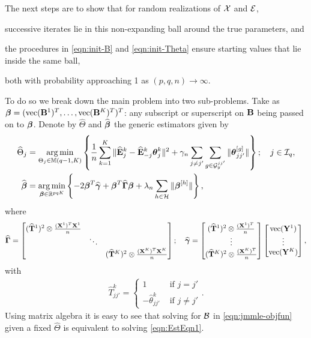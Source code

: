 The next steps are to show that for random realizations of ${\cal{X}}$ and ${\cal{E}}$,
%

\vspace{1em}
 successive iterates lie in this non-expanding ball around the true parameters, and

 the procedures in \eqref{eqn:init-B} and \eqref{eqn:init-Theta} ensure starting values that lie inside the same ball,
%

\vspace{1em}
\noindent both with probability approaching 1 as $(p,q,n) \rightarrow \infty$.

To do so we break down the main problem into two sub-problems. Take as ${\boldsymbol{\beta}} = (\operatorname*{vec} ({\mathbf{B}}^1)^T, \ldots, \operatorname*{vec}({\mathbf{B}}^K)^T)^T$: any subscript or superscript on ${\mathbf{B}}$ being passed on to ${\boldsymbol{\beta}}$. Denote by $\widehat \Theta$ and $\widehat {{\boldsymbol{\beta}}}$ the generic estimators given by
%
\begin{align}
\widehat \Theta_j &= \operatorname*{arg\,min}_{\Theta_j \in {\mathbb{M}}(q-1, K)} \left\{ \frac{1}{n} \sum_{k=1}^K \| \widehat {{\mathbf{E}}}^k_j - \widehat {{\mathbf{E}}}^k_{-j} {\boldsymbol{\theta}}_j^k \|^2 + \gamma_n \sum_{j \neq j'} \sum_{g \in {\cal{G}}_y^{jj'}} \| {\boldsymbol{\theta}}_{jj'}^{[g]} \| \right\};
\quad j \in {\cal{I}}_q, \label{eqn:EstEqn2}\\
\widehat {{\boldsymbol{\beta}}} &= \operatorname*{arg\,min}_{{\boldsymbol{\beta}} \in {\mathbb{R}}^{pqK}} \left\{-2 {\boldsymbol{\beta}}^T \widehat {{\boldsymbol{\gamma}}} + {\boldsymbol{\beta}}^T \widehat {{\boldsymbol{\Gamma}}} {\boldsymbol{\beta}} + \lambda_n \sum_{h \in {\cal{H}}} \| {\boldsymbol{\beta}}^{[h]}  \| \right\}, \label{eqn:EstEqn1}
\end{align}
%
where
%
$$
\widehat {{\boldsymbol{\Gamma}}} = \begin{bmatrix}
(\widehat {{\mathbf{T}}}^1)^2 \otimes \frac{({\mathbf{X}}^1)^T {\mathbf{X}}^1}{n} & &\\
& \ddots &\\
& & (\widehat {{\mathbf{T}}}^K)^2 \otimes \frac{({\mathbf{X}}^K)^T {\mathbf{X}}^K}{n}
\end{bmatrix}; \quad
\widehat {{\boldsymbol{\gamma}}} = \begin{bmatrix}
(\widehat {{\mathbf{T}}}^1)^2 \otimes \frac{({\mathbf{X}}^1)^T}{n}\\
\vdots\\
(\widehat {{\mathbf{T}}}^K)^2 \otimes \frac{({\mathbf{X}}^K)^T}{n}
\end{bmatrix}
\begin{bmatrix}
\operatorname*{vec} ({\mathbf{Y}}^1)\\
\vdots\\
\operatorname*{vec} ({\mathbf{Y}}^K)
\end{bmatrix},
$$
with 
%
\begin{align}\label{eqn:define-T}
\hat T_{jj'}^k = \begin{cases}
1 &\text{ if } j = j'\\
- \hat \theta_{jj'}^k &\text{ if } j \neq j'
\end{cases}.
\end{align}
%
Using matrix algebra it is easy to see that solving for ${\cal{B}}$ in \eqref{eqn:jmmle-objfun} given a fixed $\widehat \Theta$ is equivalent to solving \eqref{eqn:EstEqn1}.


